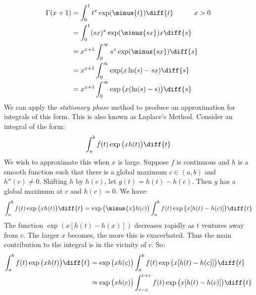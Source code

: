 \documentclass[crop=false,class=book,oneside]{standalone}
\begin{document}
        \begin{subequations}
            \begin{align}
                \Gamma(x+1)&=\int_{0}^{1}t^{x}\exp(\minus{t})\diff{t}
                \quad\quad\quad{x}>0\\
                &=\int_{0}^{1}
                    (sx)^{x}\exp(\minus{sx})x\diff{s}\\
                &=x^{x+1}\int_{0}^{\infty}
                    s^{x}\exp(\minus{sx})\diff{s}\\
                &=x^{x+1}\int_{0}^{\infty}
                    \exp(x\ln(s)-sx)\diff{s}\\
                &=x^{x+1}\int_{0}^{\infty}
                    \exp\big(x(\ln(s)-s)\big)\diff{s}
            \end{align}
        \end{subequations}
        We can apply the \textit{stationary phase} method to produce
        an approximation for integrals of this form. This is also
        known as Laplace's Method. Consider an integral of the
        form:
        \begin{equation}
            \int_{a}^{b}f(t)\exp\big(xh(t)\big)\diff{t}
        \end{equation}
        We wish to approximate this when $x$ is large. Suppose
        $f$ is continuous and $h$ is a smooth function such that
        there is a global maximum $c\in(a,b)$ and $h''(c)\ne{0}$.
        Shifting $h$ by $h(c)$, let $g(t)=h(t)-h(c)$. Then
        $g$ has a global maximum at $c$ and $h(c)=0$. We have:
        \begin{equation}
            \int_{a}^{b}f(t)\exp\big(xh(t)\big)\diff{t}=
            \exp\big(\minus{x}h(c)\big)
            \int_{a}^{b}f(t)\exp\big(x[h(t)-h(c)]\big)\diff{t}
        \end{equation}
        The function $\exp(x[h(t)-h(x)])$ decreases rapidly as
        $t$ ventures away from $c$. The larger $x$ becomes, the
        more this is exacerbated. Thus the main contribution to
        the integral is in the vicinity of $c$. So:
        \begin{align}
            \int_{a}^{b}f(t)\exp\big(xh(t)\big)\diff{t}
            &=\exp\big(xh(c)\big)\int_{a}^{b}f(t)
                \exp\big(x[h(t)-h(c)]\big)\diff{t}\\
            &\approx\exp\big(xh(c)\big)
                \int_{c-\varepsilon}^{c+\varepsilon}
                f(t)\exp\big(x[h(t)-h(c)]\big)\diff{t}
        \end{align}
\end{document}
